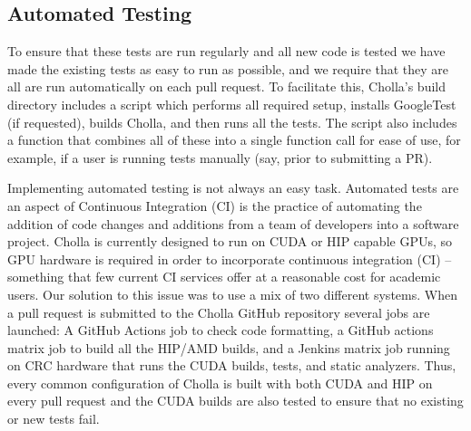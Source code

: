\subsection{Automated Testing}

To ensure that these tests are run regularly and all new code is tested we have made the existing tests as easy to run as possible, and we require that they are all are run automatically on each pull request. To facilitate this, Cholla's build directory includes a script which performs all required setup, installs GoogleTest (if requested), builds Cholla, and then runs all the tests. The script also includes a function that combines all of these into a single function call for ease of use, for example, if a user is running tests manually (say, prior to submitting a PR). 

Implementing automated testing is not always an easy task. Automated tests are an aspect of Continuous Integration (CI) is the practice of automating the addition of code changes and additions from a team of developers into a software project. Cholla is currently designed to run on CUDA or HIP capable GPUs, so GPU hardware is required in order to incorporate continuous integration (CI) -- something that few current CI services offer at a reasonable cost for academic users. Our solution to this issue was to use a mix of two different systems. When a pull request is submitted to the Cholla GitHub repository several jobs are launched: A GitHub Actions job to check code formatting, a GitHub actions matrix job to build all the HIP/AMD builds, and a Jenkins matrix job running on CRC hardware that runs the CUDA builds, tests, and static analyzers. Thus, every common configuration of Cholla is built with both CUDA and HIP on every pull request and the CUDA builds are also tested to ensure that no existing or new tests fail. 



